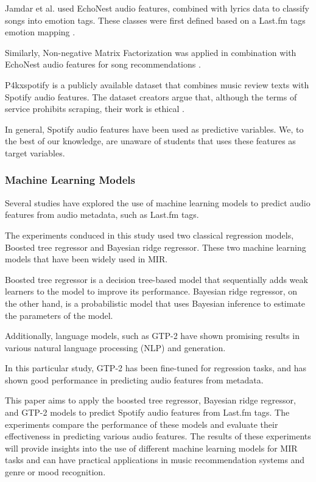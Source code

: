 \documentclass[sn-mathphys]{sn-jnl}%
\theoremstyle{thmstyleone}%
\theoremstyle{thmstyletwo}%
\theoremstyle{thmstylethree}%
\begin{document}
Jamdar et al. used EchoNest audio features, combined with lyrics data to classify songs into emotion tags.
These classes were first defined based on a Last.fm tags emotion mapping \cite{jamdar2015emotion}.

Similarly, Non-negative Matrix Factorization was applied in combination with EchoNest audio features
for song recommendations \cite{benzi2016song}.

P4kxspotify is a publicly available dataset that combines music review texts with Spotify audio features.
The dataset creators argue that, although the terms of service prohibits scraping, their work is ethical \cite{pinter2020p4kxspotify}.

In general, Spotify audio features have been used as predictive variables.
We, to the best of our knowledge, are unaware of students that uses these features as target variables.

\subsubsection{Machine Learning Models}

Several studies have explored the use of machine learning
models to predict audio features from audio metadata, such as Last.fm tags.

The experiments conduced in this study used two classical regression models,
Boosted tree regressor and Bayesian ridge regressor.
These two machine learning models that have been widely used in MIR. %

Boosted tree regressor is a decision tree-based model that sequentially
adds weak learners to the model to improve its performance.
Bayesian ridge regressor, on the other hand,
is a probabilistic model that uses Bayesian inference to estimate
the parameters of the model.

Additionally, language models, such as GTP-2 have shown promising results in various
natural language processing (NLP) and generation.

In this particular study, GTP-2 has been fine-tuned for regression tasks,
and has shown good performance in predicting audio features from metadata.

This paper aims to apply the boosted tree regressor,
 Bayesian ridge regressor, and GTP-2 models to predict Spotify audio features from Last.fm tags.
The experiments compare the performance of these models and evaluate their effectiveness
in predicting various audio features.
The results of these experiments will provide insights into
the use of different machine learning models for MIR tasks
and can have practical applications
in music recommendation systems and genre or mood recognition.
\end{document}
